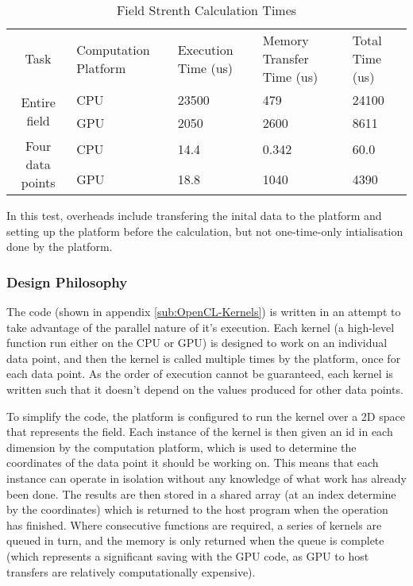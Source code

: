 \documentclass[10pt,british,english]{article}
\begin{document}
\begin{singlespace}
\begin{table}
\centering%
\begin{tabular}{|c|m{2cm}|p{2cm}|p{3cm}|m{2cm}|}
\hline
\multirow{2}{*}{Task} & \multirow{2}{3cm}{Computation Platform} & \multirow{2}{2cm}{Execution Time (us)} & \multirow{2}{3cm}{Memory Transfer Time (us)} & \multirow{2}{2cm}{Total Time (us)} \\
 &  &  &  & \\
\hline
\multirow{2}{*}{Entire field} & CPU & 23500 & 479 & 24100 \\
\cline{2-5}
 & GPU & 2050 & 2600 & 8611 \\
\hline
\multirow{2}{*}{Four data points} & CPU & 14.4 & 0.342 & 60.0 \\
\cline{2-5}
 & GPU & 18.8 & 1040 & 4390 \\
\hline
\end{tabular}

In this test, overheads include transfering the inital data to the platform and setting up the platform before the calculation, but not one-time-only intialisation done by the platform.

\caption{Field Strenth Calculation Times\label{tab:Field-Strenth-Calculation}}
\end{table}

\end{singlespace}

\subsubsection{Design Philosophy}

The code (shown in appendix \ref{sub:OpenCL-Kernels}) is written in an attempt to take advantage of the parallel nature of it's execution. Each kernel (a high-level function run either on the \ac{CPU} or \ac{GPU}) is designed to work on an individual data point, and then the kernel is called multiple times by the platform, once for each data point. As the order of execution cannot be guaranteed, each kernel is written such that it doesn't depend on the values produced for other data points.

To simplify the code, the platform is configured to run the kernel over a 2D space that represents the field. Each instance of the kernel is then given an id in each dimension by the computation platform, which is used to determine the coordinates of the data point it should be working on. This means that each instance can operate in isolation without any knowledge of what work has already been done. The results are then stored in a shared array (at an index determine by the coordinates) which is returned to the host program when the operation has finished. Where consecutive functions are required, a series of kernels are queued in turn, and the memory is only returned when the queue is complete (which represents a significant saving with the \ac{GPU} code, as \ac{GPU} to host transfers are relatively computationally expensive).
\end{document}
